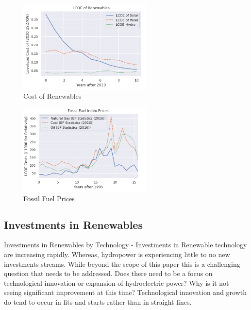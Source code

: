 \documentclass[10pt,twocolumn,letterpaper]{article}
\begin{document}
{\scriptsize
\begin{figure}[h!]
    \centering
    \includegraphics[width=0.6\textwidth]{figures/LCOE_of_renewables.PNG}
    \caption{Cost of Renewables}

\end{figure}
}

{\scriptsize
\begin{figure}[h!]
    \centering
    \includegraphics[width=0.6\textwidth]{figures/fossil_fuel_index.PNG}
    \caption{Fossil Fuel Prices}

\end{figure}
}



\subsection{Investments in Renewables}

Investments in Renewables by Technology - Investments in Renewable technology are increasing rapidly. Whereas, hydropower is experiencing little to no new investments streams. While beyond the scope of this paper this is a challenging question that needs to be addressed. Does there need to be a focus on technological innovation or expansion of hydroelectric power? Why is it not seeing significant improvement at this time? Technological innovation and growth do tend to occur in fits and starts rather than in straight lines.
\end{document}
